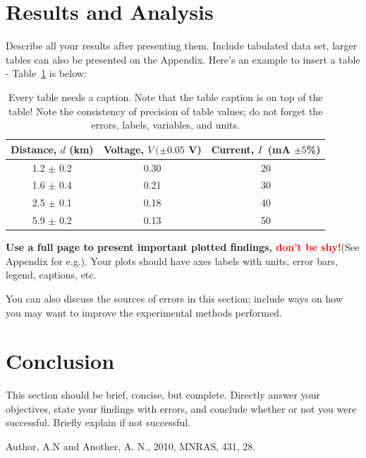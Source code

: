 \documentclass[letterpaper,11pt]{article}
\begin{document}
\section{Results and Analysis}

Describe all your results after presenting them. Include tabulated data set, larger tables can also be presented on the Appendix. Here's an example to insert a table -  Table~\ref{table1} is below:

\begin{table}[ht]
\begin{center}
\caption{Every table needs a caption. Note that the table caption is on top of the table! Note the consistency of precision of table values; do not forget the errors, labels, variables, and units.}
\label{table1}
\begin{tabular}{ccc} %
\hline
\multicolumn{1}{c}{Distance, $d$ (km) } & \multicolumn{1}{c}{Voltage, $V\ (\pm 0.05$ V)} & \multicolumn{1}{c}{Current, $I$\ (mA $\pm 5$\%)}\\
\hline
1.2 $\pm$ 0.2 &  0.30 & 20 \\
1.6 $\pm$ 0.4 &  0.21 & 30 \\
2.5 $\pm$ 0.1 &  0.18 & 40 \\
5.9 $\pm$ 0.2 &  0.13 & 50 \\
\hline
\end{tabular}
\end{center}
\end{table}

\textbf{Use a full page to present important plotted findings, \textcolor{red}{don't be shy!}}(See Appendix for e.g.). Your plots should have axes labels with units, error bars, legend, captions, etc.

You can also discuss the sources of errors in this section; include ways on how you may want to improve the experimental methods performed.



\section{Conclusion}
This section should be brief, concise, but complete. Directly answer your objectives, state your findings with errors, and conclude whether or not you were successful. Briefly explain if not successful.

\begin{thebibliography}{99}

Author, A.N and Another, A. N., 2010, MNRAS, 431, 28.

\end{thebibliography}
\end{document}
